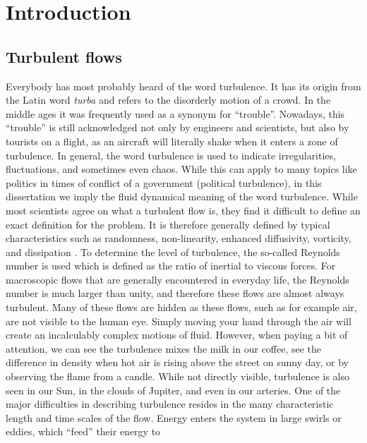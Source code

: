 \chapter*{Introduction}
\graphicspath{{fig/}}
\section*{Turbulent flows}
Everybody has most probably heard of the word turbulence. It has its origin
from the Latin word \emph{turba} and refers to the disorderly motion of a
crowd. In the middle ages it was frequently used as a synonym for ``trouble''.
Nowadays, this ``trouble'' is still acknowledged not only by engineers and
scientists, but also by tourists on a flight, as an aircraft will
literally shake when it enters a zone of turbulence.  In general, the word
turbulence is used to indicate irregularities, fluctuations, and sometimes
even chaos.  While this can apply to many topics like politics  in times of
conflict of a government (political turbulence), in this dissertation we imply
the fluid dynamical meaning of the word turbulence.
While most scientists agree on what a turbulent flow is, they find it
difficult to define an exact definition for the problem. It is therefore
generally defined by typical characteristics such as randomness,
non-linearity, enhanced diffusivity, vorticity, and dissipation
\citep{Kundu2008}.  To determine the level of turbulence, the so-called
Reynolds number is used which is defined as the ratio of inertial to viscous
forces.  For macroscopic flows that are generally encountered in everyday
life, the Reynolds number is much larger than unity, and therefore these flows
are almost always turbulent.
Many of these flows are hidden as these flows, such as for example air, are not
visible to the human eye.
Simply moving your hand through
the air will create an incalculably complex motions of fluid.  However, when
paying a bit of attention, we can see the turbulence mixes the milk in our
coffee, see the difference in density when hot air is rising above the street
on sunny day, or by observing the flame from a candle. While not directly
visible, turbulence is also seen in our Sun, in the clouds of Jupiter, and
even in our arteries. One of the major difficulties in describing turbulence
resides in the many characteristic length and time scales of the flow. Energy
enters the system in large swirls or eddies, which ``feed'' their energy to
